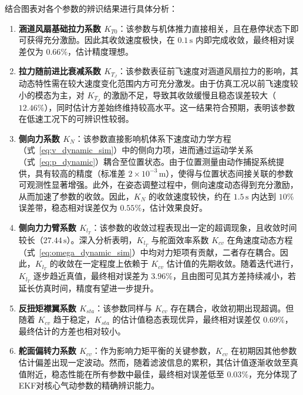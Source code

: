 结合图表对各个参数的辨识结果进行具体分析：

\begin{enumerate}
\item \textbf{涵道风扇基础拉力系数 \(K_{T0}\)}：该参数与机体推力直接相关，且在悬停状态下即可获得充分激励。因此其收敛速度极快，在 \(0.1\,\mathrm{s}\) 内即完成收敛，最终相对误差仅为 \(0.66\%\)，估计精度理想。
    
\item \textbf{拉力随前进比衰减系数 \(K_{T_J}\)}：该参数表征前飞速度对涵道风扇拉力的影响，其动态特性需在较大速度变化范围内方可充分激发。由于仿真工况以前飞速度较小的模态为主，对 \(K_{T_J}\) 的激励不足，导致其收敛缓慢且稳态误差较大（\(12.46\%\)），同时估计方差始终维持较高水平。这一结果符合预期，表明该参数在低速工况下的可辨识性较弱。

\item \textbf{侧向力系数 \(K_{N}\)}：该参数直接影响机体系下速度动力学方程（式~\eqref{eq:v_dynamic_sim}）中的侧向力项，进而通过运动学关系（式~\eqref{eq:p_dynamic}）耦合至位置状态。由于位置测量由动作捕捉系统提供，具有较高的精度（标准差 \(2\times10^{-3}\,\mathrm{m}\)），使得与位置状态间接关联的参数可观测性显著增强。此外，在姿态调整过程中，侧向速度动态得到充分激励，从而加速了参数的收敛。因此，\(K_{N}\) 的收敛速度较快，约在 \(1.5\,\mathrm{s}\) 内达到 \(10\%\) 误差带，稳态相对误差仅为 \(0.55\%\)，估计效果良好。

\item \textbf{侧向力力臂系数 \(K_{l_T}\)}：该参数的收敛过程表现出一定的超调现象，且收敛时间较长（\(27.44\,\mathrm{s}\)）。深入分析表明，\(K_{l_T}\) 与舵面效率系数 \(K_{cv}\) 在角速度动态方程（式~\eqref{eq:omega_dynamic_sim}）中均对力矩项有贡献，二者存在耦合。因此，\(K_{l_T}\) 的收敛在一定程度上依赖于 \(K_{cv}\) 估计值的先期收敛。随着迭代进行，\(K_{l_T}\) 逐步趋近真值，最终相对误差为 \(3.96\%\)，且由图可见其方差持续减小，若延长仿真时间，精度有望进一步提升。

\item \textbf{反扭矩襟翼系数 \(K_{sta}\)}：该参数同样与 \(K_{cv}\) 存在耦合，收敛初期出现超调。但随着 \(K_{cv}\) 趋于稳定，\(K_{sta}\) 的估计值稳态表现优异，最终相对误差仅 \(0.69\%\)，最终估计的方差也相对较小。

\item \textbf{舵面偏转力系数 \(K_{cv}\)}：作为影响力矩平衡的关键参数，\(K_{cv}\) 在初期因其他参数估计偏差出现一定波动。然而，随着滤波信息的累积，其估计值逐渐收敛至真值附近，稳态性能在所有参数中最佳，最终相对误差低至 \(0.03\%\)，充分体现了EKF对核心气动参数的精确辨识能力。
\end{enumerate}


